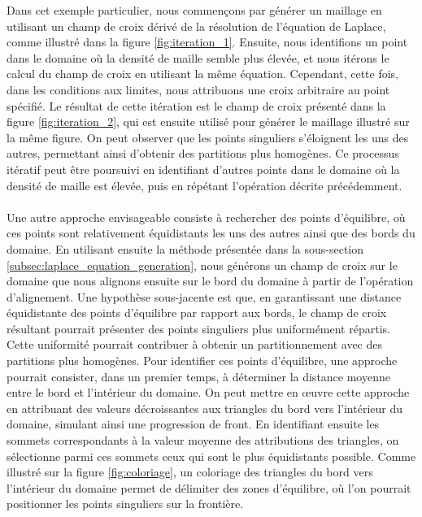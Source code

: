 Dans cet exemple particulier, nous commençons par générer un maillage en utilisant un champ de croix dérivé de la résolution de l'équation de Laplace, comme illustré dans la figure \ref{fig:iteration_1}. Ensuite, nous identifions un point dans le domaine où la densité de maille semble plus élevée, et nous itérons le calcul du champ de croix en utilisant la même équation. Cependant, cette fois, dans les conditions aux limites, nous attribuons une croix arbitraire au point spécifié. Le résultat de cette itération est le champ de croix présenté dans la figure \ref{fig:iteration_2}, qui est ensuite utilisé pour générer le maillage illustré sur la même figure. On peut observer que les points singuliers s'éloignent les uns des autres, permettant ainsi d'obtenir des partitions plus homogènes. Ce processus itératif peut être poursuivi en identifiant d'autres points dans le domaine où la densité de maille est élevée, puis en répétant l'opération décrite précédemment.\\\\
Une autre approche envisageable consiste à rechercher des points d'équilibre, où ces points sont relativement équidistants les uns des autres ainsi que des bords du domaine. En utilisant ensuite la méthode présentée dans la sous-section \ref{subsec:laplace_equation_generation}, nous générons un champ de croix sur le domaine que nous alignons ensuite sur le bord du domaine à partir de l'opération d'alignement. Une hypothèse sous-jacente est que, en garantissant une distance équidistante des points d'équilibre par rapport aux bords, le champ de croix résultant pourrait présenter des points singuliers plus uniformément répartis. Cette uniformité pourrait contribuer à obtenir un partitionnement avec des partitions plus homogènes. Pour identifier ces points d'équilibre, une approche pourrait consister, dans un premier temps, à déterminer la distance moyenne entre le bord et l'intérieur du domaine. On peut mettre en œuvre cette approche en attribuant des valeurs décroissantes aux triangles du bord vers l'intérieur du domaine, simulant ainsi une progression de front. En identifiant ensuite les sommets correspondants à la valeur moyenne des attributions des triangles, on sélectionne parmi ces sommets ceux qui sont le plus équidistants possible. Comme illustré sur la figure \ref{fig:coloriage}, un coloriage des triangles du bord vers l'intérieur du domaine permet de délimiter des zones d'équilibre, où l'on pourrait positionner les points singuliers sur la frontière.\\\\
